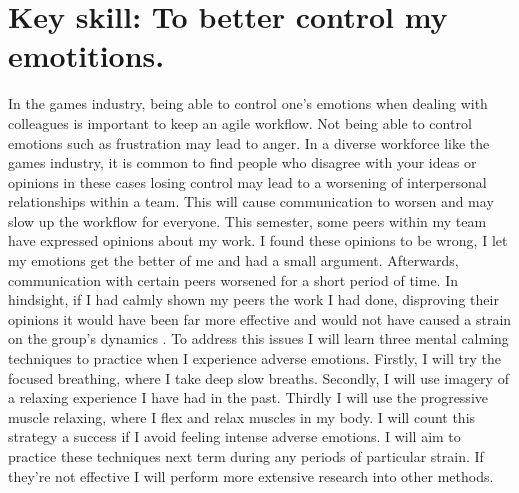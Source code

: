 \documentclass{scrartcl}
\begin{document}
\section{Key skill: To better control my emotitions.}
In the games industry, being able to control one's emotions when dealing with colleagues is important to keep an agile workflow. Not being able to control emotions such as frustration may lead to anger. In a diverse workforce like the games industry, it is common to find people who disagree with your ideas or opinions in these cases losing control may lead to a worsening of interpersonal relationships within a team. This will cause communication to worsen and may slow up the workflow for everyone. This semester, some peers within my team have expressed opinions about my work. I found these opinions to be wrong, I let my emotions get the better of me and had a small argument. Afterwards, communication with certain peers worsened for a short period of time. In hindsight, if I had calmly shown my peers the work I had done, disproving their opinions it would have been far more effective and would not have caused a strain on the group's dynamics . To address this issues I will learn three mental calming techniques to practice when I experience adverse emotions. Firstly, I will try the focused breathing, where I take deep slow breaths. Secondly, I will use imagery of a relaxing experience I have had in the past. Thirdly I will use the progressive muscle relaxing, where I flex and relax muscles in my body.  I will count this strategy a success if I avoid feeling intense adverse emotions. I will aim to practice these techniques next term during any periods of particular strain. If they're not effective I will perform more extensive research into other methods.
\end{document}
